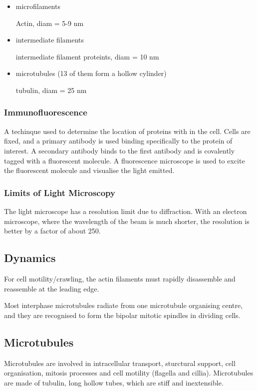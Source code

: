 \documentclass[11pt]{scrartcl}
\begin{document}
\begin{itemize}
\item microfilaments

  Actin, diam = 5-9 nm
\item intermediate filaments

  intermediate filament proteints, diam = 10 nm

  
\item microtubules (13 of them form a hollow cylinder)

  tubulin, diam =  25 nm
\end{itemize}
\subsubsection{Immunofluorescence}

A techinque used to determine the location of proteins with in the
cell. Cells are fixed, and a primary antibody is used binding
specifically to the protein of interest. A secondary antibody binds to
the first antibody and is covalently tagged with a fluorescent
molecule. A fluorescence microscope is used to excite the fluorescent
molecule and visualise the light emitted.

\subsubsection{Limits of Light Microscopy}

The light microscope has a resolution limit due to diffraction. With an electron microscope, where the wavelength of the beam is much shorter, the resolution is better by a factor of about 250.

\subsection{Dynamics}

For cell motility/crawling, the actin filaments must rapidly
disassemble and reassemble at the leading edge.

Most interphase microtubules radiate from one microtubule organising
centre, and they are recognised to form the bipolar mitotic spindles
in dividing cells.

\subsection{Microtubules}

Microtubules are involved in intracellular transport, sturctural
support, cell organisation, mitosis processes and cell motility
(flagella and cillia). Microtubules are made of tubulin, long hollow
tubes, which are stiff and inextensible.
\end{document}
